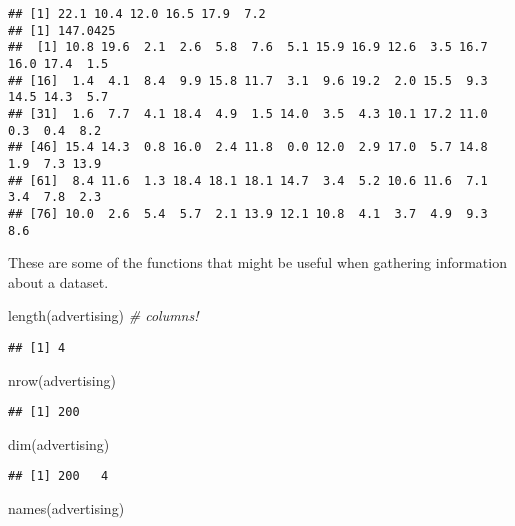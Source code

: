\documentclass[
  oneside]{book}
\newenvironment{Shaded}{\begin{snugshade}}{\end{snugshade}}
\newcommand{\CommentTok}[1]{\textcolor[rgb]{0.56,0.35,0.01}{\textit{#1}}}
\newcommand{\FunctionTok}[1]{\textcolor[rgb]{0.00,0.00,0.00}{#1}}
\newcommand{\NormalTok}[1]{#1}
\begin{document}
\begin{verbatim}
## [1] 22.1 10.4 12.0 16.5 17.9  7.2
## [1] 147.0425
##  [1] 10.8 19.6  2.1  2.6  5.8  7.6  5.1 15.9 16.9 12.6  3.5 16.7 16.0 17.4  1.5
## [16]  1.4  4.1  8.4  9.9 15.8 11.7  3.1  9.6 19.2  2.0 15.5  9.3 14.5 14.3  5.7
## [31]  1.6  7.7  4.1 18.4  4.9  1.5 14.0  3.5  4.3 10.1 17.2 11.0  0.3  0.4  8.2
## [46] 15.4 14.3  0.8 16.0  2.4 11.8  0.0 12.0  2.9 17.0  5.7 14.8  1.9  7.3 13.9
## [61]  8.4 11.6  1.3 18.4 18.1 18.1 14.7  3.4  5.2 10.6 11.6  7.1  3.4  7.8  2.3
## [76] 10.0  2.6  5.4  5.7  2.1 13.9 12.1 10.8  4.1  3.7  4.9  9.3  8.6
\end{verbatim}

These are some of the functions that might be useful
when gathering information about a dataset.

\begin{Shaded}
\begin{Highlighting}[]
\FunctionTok{length}\NormalTok{(advertising) }\CommentTok{\# columns!}
\end{Highlighting}
\end{Shaded}

\begin{verbatim}
## [1] 4
\end{verbatim}

\begin{Shaded}
\begin{Highlighting}[]
\FunctionTok{nrow}\NormalTok{(advertising)}
\end{Highlighting}
\end{Shaded}

\begin{verbatim}
## [1] 200
\end{verbatim}

\begin{Shaded}
\begin{Highlighting}[]
\FunctionTok{dim}\NormalTok{(advertising)}
\end{Highlighting}
\end{Shaded}

\begin{verbatim}
## [1] 200   4
\end{verbatim}

\begin{Shaded}
\begin{Highlighting}[]
\FunctionTok{names}\NormalTok{(advertising)}
\end{Highlighting}
\end{Shaded}
\end{document}
